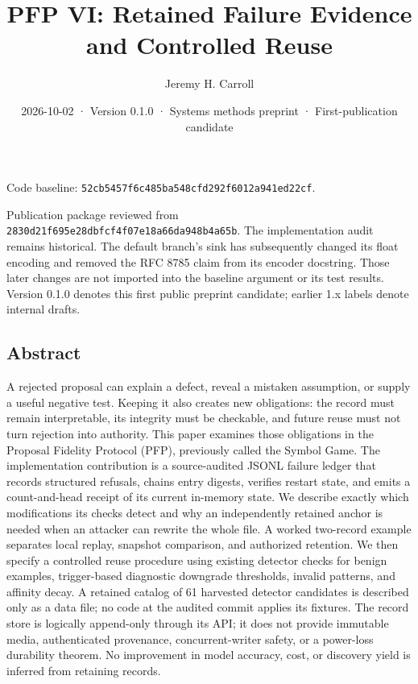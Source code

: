 \documentclass[
  11pt,
]{article}
\title{PFP VI: Retained Failure Evidence and Controlled Reuse}
\author{Jeremy H. Carroll}
\date{2026-10-02 · Version 0.1.0 · Systems methods preprint · First-publication candidate}
\begin{document}
\makeatletter
\begin{center}
{\LARGE \@title\par}
\vspace{0.8em}
{\normalsize \@author\par}
\vspace{0.5em}
{\small \@date\par}
\end{center}
\makeatother

Code baseline:
\texttt{\nolinkurl{52cb5457f6c485ba548cfd292f6012a941ed22cf}}.

Publication package reviewed from
\texttt{\nolinkurl{2830d21f695e28dbfcf4f07e18a66da948b4a65b}}. The
implementation audit remains historical. The default branch's sink has
subsequently changed its float encoding and removed the RFC 8785 claim
from its encoder docstring. Those later changes are not imported into
the baseline argument or its test results. Version 0.1.0 denotes this
first public preprint candidate; earlier 1.x labels denote internal
drafts.

\hypertarget{abstract}{%
\subsection{Abstract}\label{abstract}}

A rejected proposal can explain a defect, reveal a mistaken assumption,
or supply a useful negative test. Keeping it also creates new
obligations: the record must remain interpretable, its integrity must be
checkable, and future reuse must not turn rejection into authority. This
paper examines those obligations in the Proposal Fidelity Protocol
(PFP), previously called the Symbol Game. The implementation
contribution is a source-audited JSONL failure ledger that records
structured refusals, chains entry digests, verifies restart state, and
emits a count-and-head receipt of its current in-memory state. We
describe exactly which modifications its checks detect and why an
independently retained anchor is needed when an attacker can rewrite the
whole file. A worked two-record example separates local replay, snapshot
comparison, and authorized retention. We then specify a controlled reuse
procedure using existing detector checks for benign examples,
trigger-based diagnostic downgrade thresholds, invalid patterns, and
affinity decay. A retained catalog of 61 harvested detector candidates
is described only as a data file; no code at the audited commit applies
its fixtures. The record store is logically append-only through its API;
it does not provide immutable media, authenticated provenance,
concurrent-writer safety, or a power-loss durability theorem. No
improvement in model accuracy, cost, or discovery yield is inferred from
retaining records.
\end{document}
